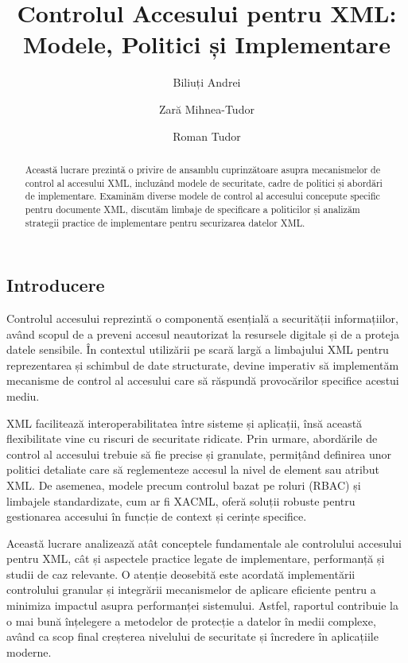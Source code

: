 \documentclass[runningheads]{llncs}
\begin{document}
\title{Controlul Accesului pentru XML: Modele, Politici și Implementare}
\author{Biliuți Andrei \and Zară Mihnea-Tudor \and Roman Tudor}
\maketitle
\begin{spacing}{1.5}
\begin{abstract}
Această lucrare prezintă o privire de ansamblu cuprinzătoare asupra mecanismelor de control al accesului XML, incluzând modele de securitate, cadre de politici și abordări de implementare. Examinăm diverse modele de control al accesului concepute specific pentru documente XML, discutăm limbaje de specificare a politicilor și analizăm strategii practice de implementare pentru securizarea datelor XML.
\end{abstract}




\section{Introducere}

Controlul accesului reprezintă o componentă esențială a securității informațiilor, având scopul de a preveni accesul neautorizat la resursele digitale și de a proteja datele sensibile. În contextul utilizării pe scară largă a limbajului XML pentru reprezentarea și schimbul de date structurate, devine imperativ să implementăm mecanisme de control al accesului care să răspundă provocărilor specifice acestui mediu.

XML facilitează interoperabilitatea între sisteme și aplicații, însă această flexibilitate vine cu riscuri de securitate ridicate. Prin urmare, abordările de control al accesului trebuie să fie precise și granulate, permițând definirea unor politici detaliate care să reglementeze accesul la nivel de element sau atribut XML. De asemenea, modele precum controlul bazat pe roluri (RBAC) și limbajele standardizate, cum ar fi XACML, oferă soluții robuste pentru gestionarea accesului în funcție de context și cerințe specifice.

Această lucrare analizează atât conceptele fundamentale ale controlului accesului pentru XML, cât și aspectele practice legate de implementare, performanță și studii de caz relevante. O atenție deosebită este acordată implementării controlului granular și integrării mecanismelor de aplicare eficiente pentru a minimiza impactul asupra performanței sistemului. Astfel, raportul contribuie la o mai bună înțelegere a metodelor de protecție a datelor în medii complexe, având ca scop final creșterea nivelului de securitate și încredere în aplicațiile moderne.




\end{spacing}
\end{document}
